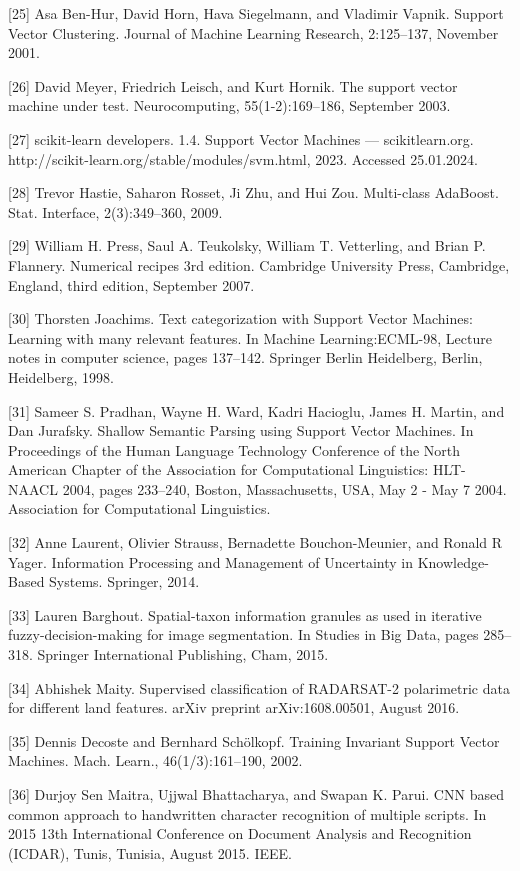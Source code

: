 \documentclass[preprint,12pt]{elsarticle}
\begin{document}
[25] Asa Ben-Hur, David Horn, Hava Siegelmann, and Vladimir Vapnik. Support Vector Clustering. Journal of Machine Learning Research, 2:125–137, November 2001. 

[26] David Meyer, Friedrich Leisch, and Kurt Hornik. The support vector machine under test. Neurocomputing, 55(1-2):169–186, September 2003. 

[27] scikit-learn developers. 1.4. Support Vector Machines — scikitlearn.org. http://scikit-learn.org/stable/modules/svm.html, 2023. Accessed 25.01.2024. 

[28] Trevor Hastie, Saharon Rosset, Ji Zhu, and Hui Zou. Multi-class AdaBoost. Stat. Interface, 2(3):349–360, 2009. 

[29] William H. Press, Saul A. Teukolsky, William T. Vetterling, and Brian P. Flannery. Numerical recipes 3rd edition. Cambridge University Press, Cambridge, England, third edition, September 2007. 

[30] Thorsten Joachims. Text categorization with Support Vector Machines: Learning with many relevant features. In Machine Learning:ECML-98, Lecture notes in computer science, pages 137–142. Springer Berlin Heidelberg, Berlin, Heidelberg, 1998. 

[31] Sameer S. Pradhan, Wayne H. Ward, Kadri Hacioglu, James H. Martin, and Dan Jurafsky. Shallow Semantic Parsing using Support Vector Machines. In Proceedings of the Human Language Technology Conference of the North American Chapter of the Association for Computational Linguistics: HLT-NAACL 2004, pages 233–240, Boston, Massachusetts, USA, May 2 - May 7 2004. Association for Computational Linguistics. 

[32] Anne Laurent, Olivier Strauss, Bernadette Bouchon-Meunier, and Ronald R Yager. Information Processing and Management of Uncertainty in Knowledge-Based Systems. Springer, 2014. 

[33] Lauren Barghout. Spatial-taxon information granules as used in iterative fuzzy-decision-making for image segmentation. In Studies in Big Data, pages 285–318. Springer International Publishing, Cham, 2015. 

[34] Abhishek Maity. Supervised classification of RADARSAT-2 polarimetric data for different land features. arXiv preprint arXiv:1608.00501, August 2016. 

[35] Dennis Decoste and Bernhard Schölkopf. Training Invariant Support Vector Machines. Mach. Learn., 46(1/3):161–190, 2002. 

[36] Durjoy Sen Maitra, Ujjwal Bhattacharya, and Swapan K. Parui. CNN based common approach to handwritten character recognition of multiple scripts. In 2015 13th International Conference on Document Analysis and Recognition (ICDAR), Tunis, Tunisia, August 2015. IEEE. 
\end{document}
